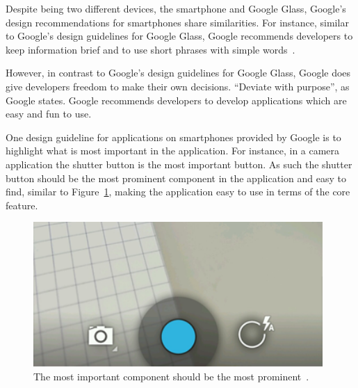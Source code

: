 Despite being two different devices, the smartphone and Google Glass, Google's design recommendations for smartphones share similarities. For instance, similar to Google's design guidelines for Google Glass, Google recommends developers to keep information brief and to use short phrases with simple words~\cite{androidDesignPrinciples}.

However, in contrast to Google's design guidelines for Google Glass, Google does give developers freedom to make their own decisions. ``Deviate with purpose'', as Google states. Google recommends developers to develop applications which are easy and fun to use. %




One design guideline for applications on smartphones provided by Google is to highlight what is most important in the application. For instance, in a camera application the shutter button is the most important button. As such the shutter button should be the most prominent component in the application and easy to find, similar to Figure~\ref{smartphonePrincinples2}, making the application easy to use in terms of the core feature.

	\begin{figure}[ht!]
		\centering
		\includegraphics[width=110mm]{images/principles_make_important_fast}
		\caption{The most important component should be the most prominent~\cite{androidDesignPrinciples}.}
		\label{smartphonePrincinples2}
	\end{figure}

